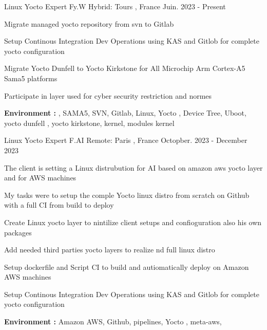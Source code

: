 \documentclass[11pt, a4paper]{awesome-cv} %
\begin{document}
\begin{cventries}


 \cventry
    {Linux Yocto Expert} %
    {Fy.W} %
    {Hybrid:  Tours , France} %
    {Juin. 2023 - Present} %
    { %
        \begin{cvitems}
            \item {Migrate managed yocto repository from svn to Gitlab }
            \item {Setup Continous Integration Dev Operations using KAS and Gitlob for complete yocto configuration}
            \item {Migrate Yocto Dunfell to Yocto Kirkstone for All Microchip Arm Cortex-A5 Sama5 platforms}
            \item {Participate in layer used for cyber security restriction and normes}
            \item { \textbf{Environment :} ,  SAMA5, SVN, Gitlab, Linux, Yocto , Device Tree, Uboot, yocto dunfell , yocto kirkstone, kernel, modules kernel}
        \end{cvitems}
    }



 \cventry
    {Linux Yocto Expert} %
    {F.AI} %
    {Remote:  Paris , France} %
    {Octopber. 2023 - December 2023} %
    { %
        \begin{cvitems}
            \item {The client is setting a Linux distrubution for AI  based on amazon aws yocto layer and  for AWS machines }
            \item {My tasks  were to setup the comple Yocto linux distro  from scratch on Github with a full CI from build to deploy}
            \item {Create Linux yocto layer to nintilize client setups and confioguration also his own packages }
            \item {Add needed third parties yocto layers to realize nd full linux distro }
            \item {Setup dockerfile and Script CI to build and autiomatically deploy on Amazon AWS machines }
	  \item {Setup Continous Integration Dev Operations using KAS and Gitlob for complete yocto configuration}
            \item { \textbf{Environment :} Amazon AWS, Github, pipelines, Yocto , meta-aws, }
        \end{cvitems}
    }


\end{cventries}
\end{document}
